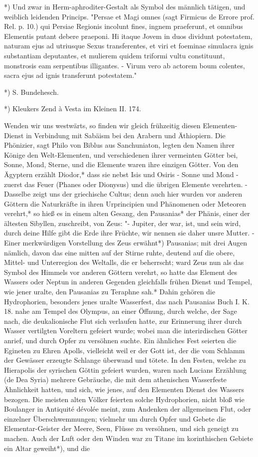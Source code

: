 \documentclass[a4paper, 11pt, oneside, polutonikogreek, german]{article}
\begin{document}
*) Und zwar in Herm-aphroditer-Gestalt als Symbol des männlich tätigen, und weiblich leidenden Princips. "Persae et Magi omnes (sagt Firmicus de Errore prof. Rel. p. 10.) qui Persiae Regionis incolunt fines, ingnem praeferunt, et omnibus Elementis putant debere praeponi. Hi itaque Jovem in duos dividunt potestatem, naturam ejus ad utriusque Sexus transferentes, et viri et foeminae simulacra ignis substantiam deputantes, et mulierem quidem triformi vultu constituunt, monstrosis eam serpentibus illigantes. - Virum vero ab actorem boum colentes, sacra ejus ad ignis transferunt potestatem."

*) S. Bundehesch.

*) Kleukers Zend à Vesta im Kleinen II. 174.

Wenden wir uns westwärts, so finden wir gleich frühzeitig diesen Elementen-Dienst in Verbindung mit Sabäism bei den Arabern und Äthiopiern. Die Phönizier, sagt Philo von Biblus aus Sanchuniaton, legten den Namen ihrer Könige den Welt-Elementen, und verschiedenen ihrer vermeinten Götter bei, Sonne, Mond, Sterne, und die Elemente waren ihre einzigen Götter. Von den Ägyptern erzählt Diodor,* dass sie nebst Isis und Osiris - Sonne und Mond - zuerst das Feuer (Phanes oder Dionysus) und die übrigen Elemente verehrten. - Dasselbe zeigt uns der griechische Cultus; denn auch hier wurden vor anderen Göttern die Naturkräfte in ihren Urprincipien und Phänomenen oder Meteoren verehrt,* so hieß es in einem alten Gesang, den Pausanias* der Phänis, einer der ältesten Sibyllen, zuschreibt, von Zeus: "- Jupiter, der war, ist, und sein wird, durch deine Hilfe gibt die Erde ihre Früchte, wir nennen sie daher unsre Mutter. - Einer merkwürdigen Vorstellung des Zeus erwähnt*) Pausanias; mit drei Augen nämlich, davon das eine mitten auf der Stirne ruhte, deutend auf die obere, Mittel- und Unterregion des Weltalls, die er beherrscht; ward Zeus nun als das Symbol des Himmels vor anderen Göttern verehrt, so hatte das Element des Wassers oder Neptun in anderen Gegenden gleichfalls frühen Dienst und Tempel, wie jener uralte, den Pausanias zu Teraphne sah.* Dahin gehören die Hydrophorien, besonders jenes uralte Wasserfest, das nach Pausanias Buch I. K. 18. nahe am Tempel des Olympus, an einer Öffnung, durch welche, der Sage nach, die deukalionische Flut sich verlaufen hatte, zur Erinnerung ihrer durch Wasser vertilgten Voreltern gefeiert wurde; wobei man die interirdischen Götter anrief, und durch Opfer zu versöhnen suchte. Ein ähnliches Fest seierten die Egineten zu Ehren Apolls, vielleicht weil er der Gott ist, der die vom Schlamm der Gewässer erzeugte Schlange überwand und tötete. In den Festen, welche zu Hierapolis der syrischen Göttin gefeiert wurden, waren nach Lucians Erzählung (de Dea Syria) mehrere Gebräuche, die mit dem athenischen Wasserfeste Ähnlichkeit hatten, und sich, wie jenes, auf den Elementen Dienst des Wassers bezogen. Die meisten alten Völker feierten solche Hydrophorien, nicht bloß wie Boulanger in Antiquité dévolée meint, zum Andenken der allgemeinen Flut, oder einzelner Überschwemmungen; vielmehr um durch Opfer und Gebete die Elementar-Geister der Meere, Seen, Flüsse zu versöhnen, und sich geneigt zu machen. Auch der Luft oder den Winden war zu Titane im korinthischen Gebiete ein Altar geweiht*), und die 
\end{document}
